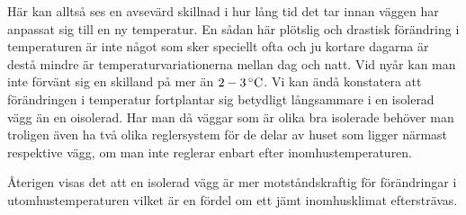 Här kan alltså ses en avsevärd skillnad i hur lång tid det tar innan väggen har anpassat sig till en ny temperatur. En sådan här plötslig och drastisk förändring i temperaturen är inte något som sker speciellt ofta och ju kortare dagarna är destå mindre är temperaturvariationerna mellan dag och natt. %
Vid nyår kan man inte förvänt sig en skilland på mer än $\unit[2-3]{^\circ C}$. Vi kan ändå konstatera att förändringen i temperatur fortplantar sig betydligt långsammare i en isolerad vägg än en oisolerad. Har man då väggar som är olika bra isolerade behöver man troligen även ha två olika reglersystem för de delar av huset som ligger närmast respektive vägg, om man inte reglerar enbart efter inomhustemperaturen. 

Återigen visas det att en isolerad vägg är mer motståndskraftig för förändringar i utomhustemperaturen vilket är en fördel om ett jämt inomhusklimat eftersträvas.
